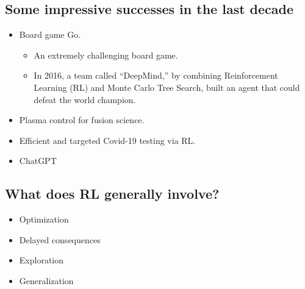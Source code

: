 \subsection{Some impressive successes in the last decade}
\begin{summary}
    \begin{itemize}
        \item Board game Go.
        \begin{itemize}
            \item An extremely challenging board game.
            \item In 2016, a team called ``DeepMind,'' by combining Reinforcement Learning (RL) and Monte Carlo Tree Search, built an agent that could defeat the world champion.
        \end{itemize}
        \item Plasma control for fusion science.
        \item Efficient and targeted Covid-19 testing via RL. 
        \item ChatGPT
    \end{itemize}
\end{summary}

\subsection{What does RL generally involve?}
\begin{summary}
    \begin{itemize}
        \item Optimization
        \item Delayed consequences
        \item Exploration 
        \item Generalization
    \end{itemize}

\end{summary}

